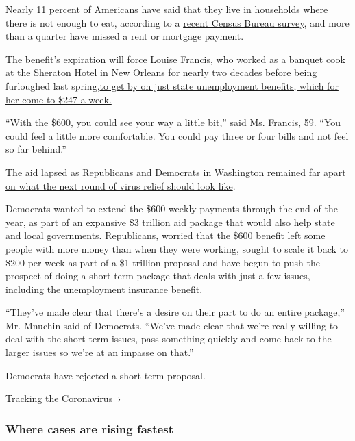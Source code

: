 Nearly 11 percent of Americans have said that they live in households
where there is not enough to eat, according to a
\href{https://www.census.gov/programs-surveys/household-pulse-survey/data.html?utm_campaign=20200727mspuls1ccdtanl\&utm_medium=email\&utm_source=govdelivery}{recent
Census Bureau survey}, and more than a quarter have missed a rent or
mortgage payment.

The benefit's expiration will force Louise Francis, who worked as a
banquet cook at the Sheraton Hotel in New Orleans for nearly two decades
before being furloughed last
spring,\href{https://www.nytimes.com/2020/07/30/business/economy/q2-gdp-coronavirus-economy.html}{to
get by on just state unemployment benefits, which for her come to \$247
a week.}

``With the \$600, you could see your way a little bit,'' said Ms.
Francis, 59. ``You could feel a little more comfortable. You could pay
three or four bills and not feel so far behind.''

The aid lapsed as Republicans and Democrats in Washington
\href{https://www.nytimes.com/2020/07/28/us/politics/coronavirus-relief-bills-house-senate.html}{remained
far apart on what the next round of virus relief should look like}.

Democrats wanted to extend the \$600 weekly payments through the end of
the year, as part of an expansive \$3 trillion aid package that would
also help state and local governments. Republicans, worried that the
\$600 benefit left some people with more money than when they were
working, sought to scale it back to \$200 per week as part of a \$1
trillion proposal and have begun to push the prospect of doing a
short-term package that deals with just a few issues, including the
unemployment insurance benefit.

``They've made clear that there's a desire on their part to do an entire
package,'' Mr. Mnuchin said of Democrats. ``We've made clear that we're
really willing to deal with the short-term issues, pass something
quickly and come back to the larger issues so we're at an impasse on
that.''

Democrats have rejected a short-term proposal.

\href{https://www.nytimes.com/interactive/2020/us/coronavirus-us-cases.html}{Tracking
the Coronavirus~›}

\href{https://www.nytimes.com/interactive/2020/us/coronavirus-us-cases.html}{}

\hypertarget{where-cases-are-rising-fastest}{%
\subsubsection{\texorpdfstring{Where cases are \textbf{rising}
fastest}{Where cases are rising fastest}}\label{where-cases-are-rising-fastest}}

